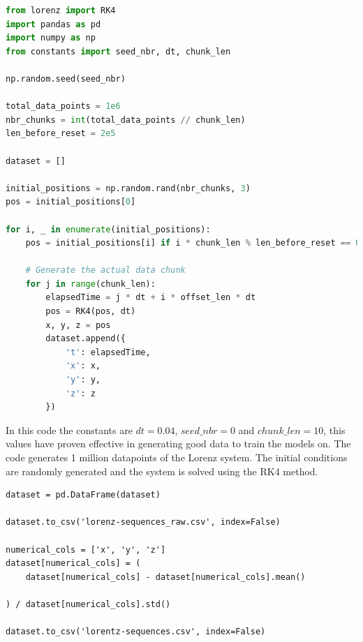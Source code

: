 \documentclass[11pt]{article}
\begin{document}
\begin{lstlisting}[language=Python]
from lorenz import RK4
import pandas as pd
import numpy as np
from constants import seed_nbr, dt, chunk_len

np.random.seed(seed_nbr)

total_data_points = 1e6
nbr_chunks = int(total_data_points // chunk_len)
len_before_reset = 2e5

dataset = []

initial_positions = np.random.rand(nbr_chunks, 3) 
pos = initial_positions[0]

for i, _ in enumerate(initial_positions):
    pos = initial_positions[i] if i * chunk_len % len_before_reset == 0 else pos
   
    # Generate the actual data chunk
    for j in range(chunk_len):
        elapsedTime = j * dt + i * offset_len * dt
        pos = RK4(pos, dt)
        x, y, z = pos
        dataset.append({
            't': elapsedTime,
            'x': x,
            'y': y,
            'z': z
        })
\end{lstlisting}

In this code the constants are $dt = 0.04$, $seed\_nbr = 0$ and $chunk\_len = 10$, this values have proven effective in generating good data to train the models on. The code generates 1 million datapoints of the Lorenz system. The initial conditions are randomly generated and the system is solved using the RK4 method.

\begin{lstlisting}
dataset = pd.DataFrame(dataset)

dataset.to_csv('lorenz-sequences_raw.csv', index=False)

numerical_cols = ['x', 'y', 'z']
dataset[numerical_cols] = (
    dataset[numerical_cols] - dataset[numerical_cols].mean()

) / dataset[numerical_cols].std()

dataset.to_csv('lorentz-sequences.csv', index=False)
\end{lstlisting}
\end{document}
